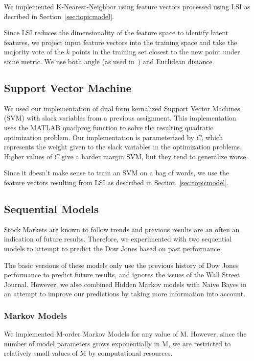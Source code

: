 \documentclass[10pt, twocolumn]{article}
\begin{document}
We implemented K-Nearest-Neighbor using feature vectors processed using LSI as decribed in Section~\ref{sec:topicmodel}.

Since LSI reduces the dimensionality of the feature space to identify latent features, we project input feature vectors into the training space and take the majority vote of the $k$ points in the training set closest to the new point under some metric. We use both angle (as used in~\cite{lsi}) and Euclidean distance.

\subsection{Support Vector Machine}
\label{sec:svm}

We used our implementation of dual form kernalized Support Vector Machines (SVM) with slack variables from a previous assignment.
This implementation uses the MATLAB quadprog function to solve the resulting quadratic optimization problem.
Our implementation is parameterized by $C$, which represents the weight given to the slack variables in the optimization problems. Higher values of $C$ give a harder margin SVM, but they tend to generalize worse.

Since it doesn't make sense to train an SVM on a bag of words, we use the feature vectors resulting from LSI as described in Section~\ref{sec:topicmodel}.

\subsection{Sequential Models}
\label{sec:sequential-models}

Stock Markets are known to follow trends and previous results are an often an indication of future results.
Therefore, we experimented with two sequential models to attempt to predict the Dow Jones based on past performance.

The basic versions of these models only use the previous history of Dow Jones performance to predict future results, and ignores the issues of the Wall Street Journal.
However, we also combined Hidden Markov models with Naive Bayes in an attempt to improve our predictions by taking more information into account.

\subsubsection{Markov Models}
\label{sec:mm}

We implemented M-order Markov Models for any value of M. However, since the number of model parameters grows exponentially in M, we are restricted to relatively small values of M by computational resources.
\end{document}
